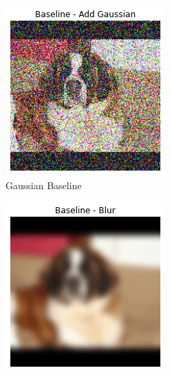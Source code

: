 \begin{figure}[h]
  \centering
 \begin{subfigure}{.23\textwidth}
    \centering
    \includegraphics[width=\textwidth]{methods/images/ig-saint_bernard-gaussian.png}
    \caption{Gaussian Baseline}\label{fig:ig-baseline-gaussian}
\end{subfigure}
 \begin{subfigure}{.23\textwidth}
    \centering
    \includegraphics[width=\textwidth]{methods/images/ig-saint_bernard-blur.png}

\end{subfigure}
\end{figure}
